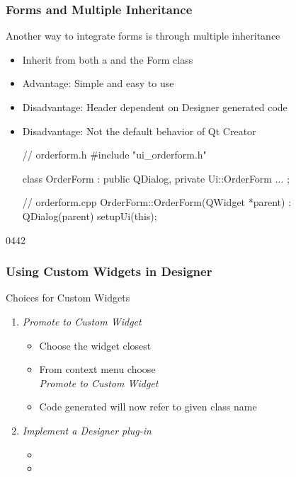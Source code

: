 \begin{slide}[fragile]
\frametitle{Forms and Multiple Inheritance}
Another way to integrate forms is through multiple inheritance
\begin{itemize}
\item Inherit from both a  and the Form class
\item Advantage: Simple and easy to use
\item Disadvantage: Header dependent on Designer generated code
\item Disadvantage: Not the default behavior of Qt Creator
   \begin{cpp}
// orderform.h
#include "ui_orderform.h"

class OrderForm : public QDialog, private Ui::OrderForm {
    ...
};

// orderform.cpp
OrderForm::OrderForm(QWidget *parent) : QDialog(parent) {
  setupUi(this);
}
\end{cpp}
\end{itemize}

\end{slide}

\begin{slide}[fragile]{0442}
\frametitle{Using Custom Widgets in Designer}\label{designer_plugins}
Choices for Custom Widgets
\begin{enumerate}
\item \emph{Promote to Custom Widget}
  \begin{itemize}
  \item Choose the widget closest
  \item From context menu choose \\ \emph{Promote to Custom Widget}
  \item Code generated will now refer to given class name
  \end{itemize}
\item \emph{Implement a Designer plug-in}
  \begin{itemize}
  \item {}
  \item {}
  \end{itemize}
\end{enumerate}
\end{slide}

